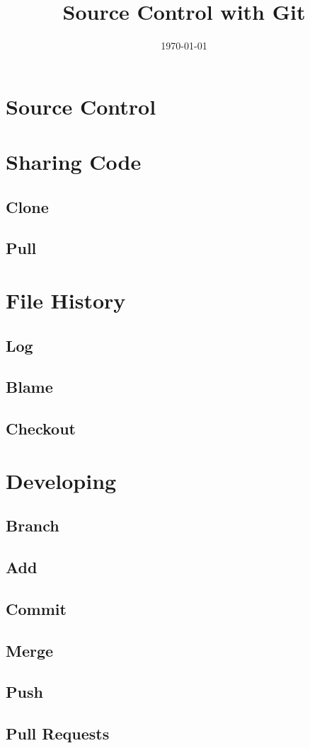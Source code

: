 \documentclass{beamer}
\title{Source Control with Git}
\date{\today}
\begin{document}
\begin{frame}
\titlepage
\end{frame}

\begin{frame}
\tableofcontents
\end{frame}

\section{Source Control}

\section{Sharing Code}
\subsection{Clone}
\subsection{Pull}

\section{File History}
\subsection{Log}
\subsection{Blame}
\subsection{Checkout}

\section{Developing}
\subsection{Branch}
\subsection{Add}
\subsection{Commit}
\subsection{Merge}
\subsection{Push}
\subsection{Pull Requests}

\begin{frame}
\end{frame}
\end{document}
